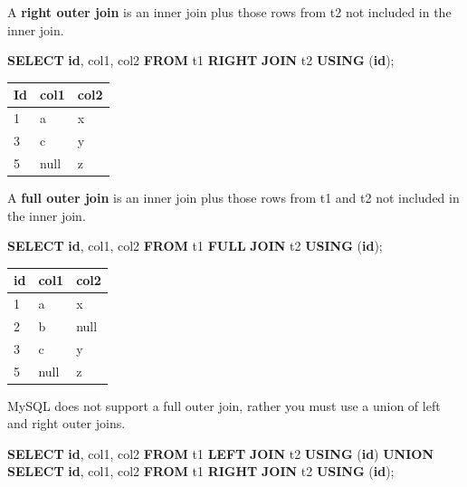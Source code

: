 \documentclass[
]{article}
\newenvironment{Shaded}{\begin{snugshade}}{\end{snugshade}}
\newcommand{\KeywordTok}[1]{\textcolor[rgb]{0.13,0.29,0.53}{\textbf{#1}}}
\newcommand{\NormalTok}[1]{#1}
\begin{document}
A \textbf{right outer join} is an inner join plus those rows from t2 not
included in the inner join.

\begin{Shaded}
\begin{Highlighting}[]
\KeywordTok{SELECT} \KeywordTok{id}\NormalTok{, col1, col2 }\KeywordTok{FROM}\NormalTok{ t1 }\KeywordTok{RIGHT} \KeywordTok{JOIN}\NormalTok{ t2 }\KeywordTok{USING}\NormalTok{ (}\KeywordTok{id}\NormalTok{);}
\end{Highlighting}
\end{Shaded}

\begin{longtable}[]{@{}lll@{}}
\toprule()
Id & col1 & col2 \\
\midrule()
\endhead
1 & a & x \\
3 & c & y \\
5 & null & z \\
\bottomrule()
\end{longtable}

A \textbf{full outer join} is an inner join plus those rows from t1 and
t2 not included in the inner join.

\begin{Shaded}
\begin{Highlighting}[]
\KeywordTok{SELECT} \KeywordTok{id}\NormalTok{, col1, col2 }\KeywordTok{FROM}\NormalTok{ t1 }\KeywordTok{FULL} \KeywordTok{JOIN}\NormalTok{ t2 }\KeywordTok{USING}\NormalTok{ (}\KeywordTok{id}\NormalTok{);}
\end{Highlighting}
\end{Shaded}

\begin{longtable}[]{@{}lll@{}}
\toprule()
id & col1 & col2 \\
\midrule()
\endhead
1 & a & x \\
2 & b & null \\
3 & c & y \\
5 & null & z \\
\bottomrule()
\end{longtable}

MySQL does not support a full outer join, rather you must use a union of
left and right outer joins.

\begin{Shaded}
\begin{Highlighting}[]
\KeywordTok{SELECT} \KeywordTok{id}\NormalTok{, col1, col2 }\KeywordTok{FROM}\NormalTok{ t1 }\KeywordTok{LEFT} \KeywordTok{JOIN}\NormalTok{ t2 }\KeywordTok{USING}\NormalTok{ (}\KeywordTok{id}\NormalTok{)}
\KeywordTok{UNION}
\KeywordTok{SELECT} \KeywordTok{id}\NormalTok{, col1, col2 }\KeywordTok{FROM}\NormalTok{ t1 }\KeywordTok{RIGHT} \KeywordTok{JOIN}\NormalTok{ t2 }\KeywordTok{USING}\NormalTok{ (}\KeywordTok{id}\NormalTok{);}
\end{Highlighting}
\end{Shaded}
\end{document}
